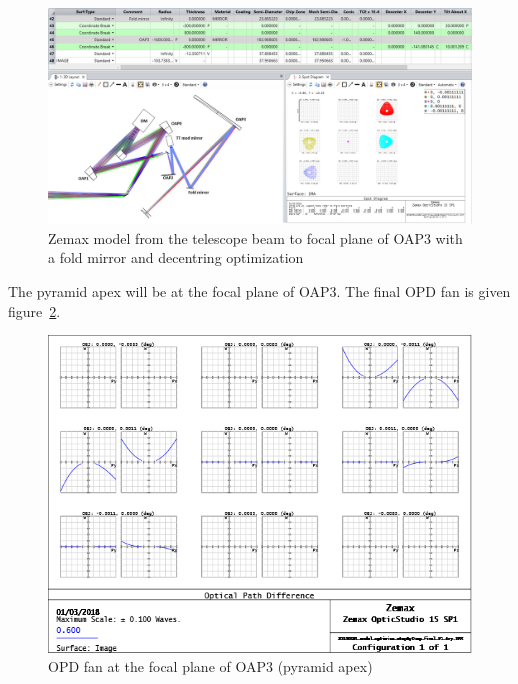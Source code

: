 \documentclass[12pt,a4paper]{article}
\begin{document}
\begin{figure}[H]
	\begin{center}
		\includegraphics[width=\textwidth]{images/Zemax_model_FP_OAP3_fold_2nd_approach.PNG}
		\caption{Zemax model from the telescope beam to focal plane of OAP3 with a fold mirror and decentring optimization}\label{fig:Zemax_model_FP_OAP3_fold_2nd_approach}
	\end{center}
\end{figure}
The pyramid apex will be at the focal plane of OAP3.
The final OPD fan is given figure~\ref{fig:OPD_Fan_PyrApex_2nd_approach}.
\begin{figure}[H]
	\begin{center}
		\includegraphics[width=.5\textwidth]{images/OPD_Fan_PyrApex_2nd_approach.PNG}
		\caption{OPD fan at the focal plane of OAP3 (pyramid apex)}\label{fig:OPD_Fan_PyrApex_2nd_approach}
	\end{center}
\end{figure}
\end{document}
